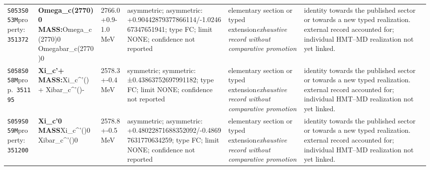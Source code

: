 \begin{landscape}
\begin{longtable}{L{1.85cm}L{4.45cm}L{2.35cm}L{4.05cm}L{3.35cm}L{7.15cm}}
\texttt{S053}\newline \texttt{S053M}\newline property:\ \texttt{351372} & \textbf{Omega\_\allowbreak{}c(2770)0 MASS:}\newline Omega\_\allowbreak{}c(2770)0 \textbar{}\allowbreak{} Omegabar\_\allowbreak{}c(2770)0 & 2766.0+0.9-1.0\,MeV & asymmetric; asymmetric: +0.90442879377866114/-1.024667347651941; type FC; limit NONE; confidence not reported & elementary section or typed extension\newline \emph{exhaustive record without comparative promotion} & identity towards the published sector or towards a new typed realization. external record accounted for; individual HMT--MD realization not yet linked. \\
\texttt{S058}\newline \texttt{S058M}\newline prop.\ \texttt{351195} & \textbf{Xi\_\allowbreak{}c'+ MASS:}\newline Xi\_\allowbreak{}c\textasciicircum{}'()+ \textbar{}\allowbreak{} Xibar\_\allowbreak{}c\textasciicircum{}'()- & 2578.3+-0.4\,MeV & symmetric; symmetric: ±0.43863752697991182; type FC; limit NONE; confidence not reported & elementary section or typed extension\newline \emph{exhaustive record without comparative promotion} & identity towards the published sector or towards a new typed realization. external record accounted for; individual HMT--MD realization not yet linked. \\
\texttt{S059}\newline \texttt{S059M}\newline property:\ \texttt{351200} & \textbf{Xi\_\allowbreak{}c'0 MASS}\newline Xi\_\allowbreak{}c\textasciicircum{}'()0 \textbar{}\allowbreak{} Xibar\_\allowbreak{}c\textasciicircum{}'()0 & 2578.8+-0.5\,MeV & asymmetric; asymmetric: +0.48022871688352092/-0.48697631770634259; type FC; limit NONE; confidence not reported & elementary section or typed extension\newline \emph{exhaustive record without comparative promotion} & identity towards the published sector or towards a new typed realization. external record accounted for; individual HMT--MD realization not yet linked. \\

\end{longtable}
\end{landscape}
